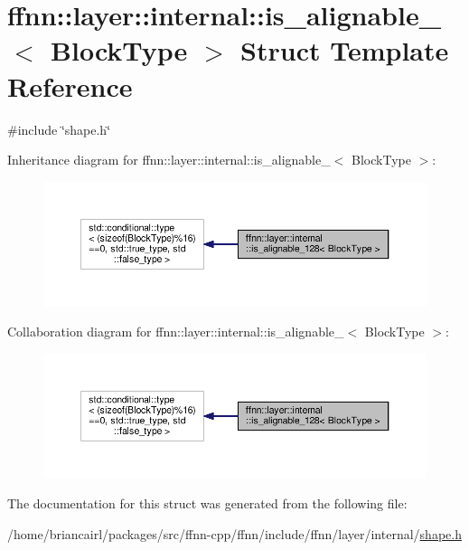 \hypertarget{structffnn_1_1layer_1_1internal_1_1is__alignable__128}{\section{ffnn\-:\-:layer\-:\-:internal\-:\-:is\-\_\-alignable\-\_$<$ Block\-Type $>$ Struct Template Reference}
\label{structffnn_1_1layer_1_1internal_1_1is__alignable__128}
}


{\ttfamily \#include \char`\"{}shape.\-h\char`\"{}}



Inheritance diagram for ffnn\-:\-:layer\-:\-:internal\-:\-:is\-\_\-alignable\-\_$<$ Block\-Type $>$\-:
\nopagebreak
\begin{figure}[H]
\begin{center}
\leavevmode
\includegraphics[width=350pt]{structffnn_1_1layer_1_1internal_1_1is__alignable__128__inherit__graph}
\end{center}
\end{figure}


Collaboration diagram for ffnn\-:\-:layer\-:\-:internal\-:\-:is\-\_\-alignable\-\_$<$ Block\-Type $>$\-:
\nopagebreak
\begin{figure}[H]
\begin{center}
\leavevmode
\includegraphics[width=350pt]{structffnn_1_1layer_1_1internal_1_1is__alignable__128__coll__graph}
\end{center}
\end{figure}


The documentation for this struct was generated from the following file\-:\begin{DoxyCompactItemize}
\item 
/home/briancairl/packages/src/ffnn-\/cpp/ffnn/include/ffnn/layer/internal/\hyperlink{shape_8h}{shape.\-h}\end{DoxyCompactItemize}
